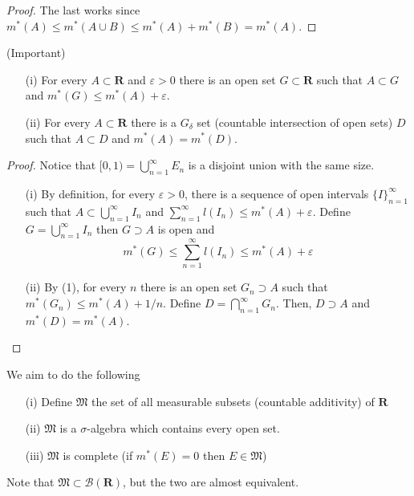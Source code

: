 \vspace{2ex}
\begin{proof}
The last works since $m^{*}(A)\leq m^{*}(A\cup B)\leq m^{*}(A)+m^{*}(B)=m^{*}(A)$.
\end{proof}
\vspace{2ex}
\begin{thm}
	(Important)
\begin{itemize}

	\item[(i)] For every $A\subset {\bm R}$ and $\varepsilon >0$ there is an open set $G\subset {\bm R}$ such that $A\subset G$ and $m^{*}(G)\leq m^{*}(A)+\varepsilon $. 
	\item[(ii)] For every $A\subset {\bm R}$ there is a $G_{\delta }$ set (countable intersection of open sets) $D$ such that $A\subset D$ and $m^{*}(A)=m^{*}(D)$.
\end{itemize}
\end{thm}
\vspace{2ex}
\begin{proof}
Notice that $[0,1)=\bigcup_{n=1}^{\infty }E_{n}$ is a disjoint union with the same size.
\begin{itemize}
	\item[(i)] By definition, for every $\varepsilon >0$, there is a sequence of open intervals $\{I\}_{n=1}^{\infty }$ such that $A\subset \bigcup_{n=1}^{\infty }I_{n}$ and $\sum _{n=1}^{\infty }l(I_{n})\leq m^{*}(A)+\varepsilon $. Define $G=\bigcup^{\infty }_{n=1}I_{n}$ then $G\supset A$ is open and
		\[m^{*}(G)\leq \sum ^{\infty }_{n=1}l(I_{n})\leq m^{*}(A)+\varepsilon \]
	\item[(ii)] By (1), for every $n$ there is an open set $G_{n}\supset A$ such that $m^{*}(G_{n})\leq m^{*}(A)+1/n$. Define $D=\bigcap^{\infty }_{n=1}G_{n}$. Then, $D\supset A$ and $m^{*}(D)=m^{*}(A)$. 
\end{itemize}
\end{proof}
\vspace{2ex}
\begin{rmk}
We aim to do the following
\begin{itemize}
	\item[(i)] Define $\mathfrak{M}$ the set of all measurable subsets (countable additivity) of ${\bm R}$ 
	\item[(ii)] $\mathfrak{M}$ is a $\sigma $-algebra which contains every open set.
	\item[(iii)] $\mathfrak{M}$ is complete (if $m^{*}(E)=0$ then $E\in \mathfrak{M}$)
\end{itemize}
Note that $\mathfrak{M}\subset \mathcal{B} ({\bm R})$, but the two are almost equivalent.
\end{rmk}
